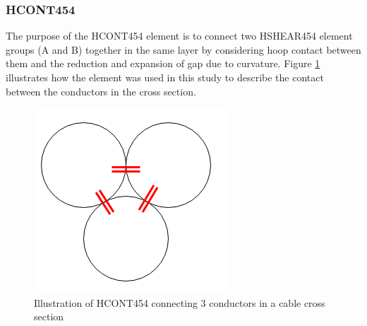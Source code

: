 \subsubsection{HCONT454}
The purpose of the HCONT454 element is to connect two HSHEAR454 element groups (A and B) together in the same layer by considering hoop contact between them and the reduction and expansion of gap due to curvature. Figure \ref{fig:HCONT4541} illustrates how the element was used in this study to describe the contact between the conductors in the cross section.
\begin{figure}[H]
\centering
\includegraphics[scale=0.7]{figures/HCONT4541}
\caption[$\; \:$Illustration of HCONT454]{Illustration of HCONT454 connecting 3 conductors in a cable cross section}
 \label{fig:HCONT4541}
\end{figure}


